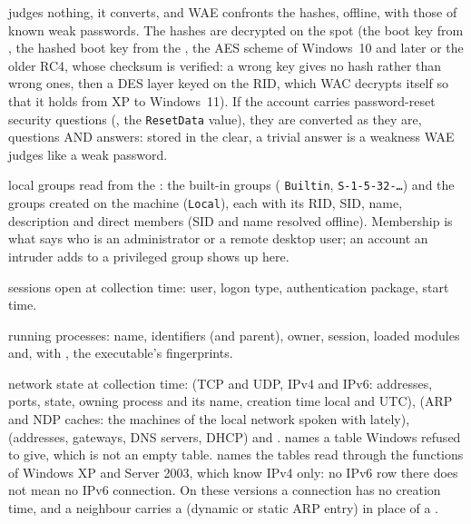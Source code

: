 \documentclass[11pt,a4paper,oneside]{report}
\begin{document}
\begin{description}[style=nextline,leftmargin=1.2em]
{        judges nothing}, it converts, and WAE confronts the hashes, offline, with
        those of known weak passwords. The hashes are decrypted on the spot (the
        boot key from , the hashed boot key from the ,
        the AES scheme of Windows~10 and later or the older RC4, whose checksum
        is verified: a wrong key gives no hash rather than wrong ones, then a
        DES layer keyed on the RID, which WAC decrypts itself so that it holds
        from XP to Windows~11). If the account carries password-reset security
        questions (, the \texttt{ResetData} value), they
        are converted as they are, questions AND answers: stored in the clear, a
        trivial answer is a weakness WAE judges like a weak password.
  \item[\fichier{local\_groups.json}] local groups read from the :
        the built-in groups ( \texttt{Builtin}, \texttt{S-1-5-32-…})
        and the groups created on the machine (\texttt{Local}), each with its RID,
        SID, name, description and direct members (SID and name resolved offline).
        Membership is what says who is an administrator or a remote desktop user;
        an account an intruder adds to a privileged group shows up here.
  \item[\fichier{Sessions.json}] sessions open at collection time: user, logon
        type, authentication package, start time.
  \item[\fichier{processes.json}] running processes: name, identifiers (and
        parent), owner, session, loaded modules and, with , the
        executable's fingerprints.
  \item[\fichier{network.json}] network state at collection time:
         (TCP and UDP, IPv4 and IPv6: addresses, ports,
        state, owning process and its name, creation time local and UTC),
         (ARP and NDP caches: the machines of the local network
        spoken with lately),  (addresses, gateways, DNS
        servers, DHCP) and .  names a table
        Windows refused to give, which is not an empty table.
         names the tables read through the functions of
        Windows XP and Server 2003, which know IPv4 only: no IPv6 row there
        does not mean no IPv6 connection. On these versions a connection has
        no creation time, and a neighbour carries a  (dynamic or
        static ARP entry) in place of a .

\end{description}
\end{document}
